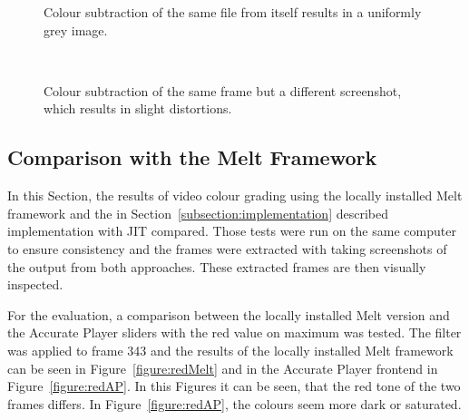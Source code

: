\documentclass[../MasterThesis.tex]{subfiles}
\begin{document}
\begin{minipage}{0.48\textwidth}
	
	\begin{figure}[H]
		\begin{center}
			\caption[Colour subtraction of the same file from itself.]{Colour subtraction of the same file from itself results in a uniformly grey image.}
			\label{figure:greyresult_unit}
		\end{center}
	\end{figure}
\end{minipage}\begin{minipage}{0.04\textwidth}
	\ 
\end{minipage}\begin{minipage}{0.48\textwidth}	
	\begin{figure}[H]
		\begin{center}
			\caption[Colour subtraction of the same frame but a different screenshot.]{Colour subtraction of the same frame but a different screenshot, which results in slight distortions.}
			\label{figure:greyresult_blurry}
		\end{center}
	\end{figure}
\end{minipage}












\subsection{Comparison with the Melt Framework} \label{section:comparisonMelt}


In this Section, the results of video colour grading using the locally installed Melt framework and the in Section~\ref{subsection:implementation} described implementation with JIT compared. 
Those tests were run on the same computer to ensure consistency and the frames were extracted with taking screenshots of the output from both approaches. These extracted frames are then visually inspected. 


For the evaluation, a comparison between the locally installed Melt version and the Accurate Player sliders with the red value on maximum was tested. The filter was applied to frame 343 and the results of the locally installed Melt framework can be seen in Figure~\ref{figure:redMelt} and in the Accurate Player frontend in Figure~\ref{figure:redAP}. In this Figures it can be seen, that the red tone of the two frames differs. In Figure~\ref{figure:redAP}, the colours seem more dark or saturated.
\end{document}
